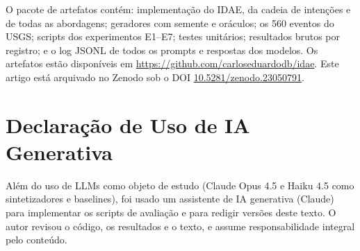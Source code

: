 \documentclass[sigconf,nonacm]{acmart}
\begin{document}
O pacote de artefatos contém: implementação do IDAE, da cadeia de intenções e de todas as abordagens; geradores com semente e oráculos; os 560 eventos do USGS; scripts dos experimentos E1--E7; testes unitários; resultados brutos por registro; e o log JSONL de todos os prompts e respostas dos modelos. Os artefatos estão disponíveis em \url{https://github.com/carloseduardodb/idae}. Este artigo está arquivado no Zenodo sob o DOI \href{https://doi.org/10.5281/zenodo.23050791}{10.5281/zenodo.23050791}.

\section*{Declaração de Uso de IA Generativa}

Além do uso de LLMs como objeto de estudo (Claude Opus 4.5 e Haiku 4.5 como sintetizadores e baselines), foi usado um assistente de IA generativa (Claude) para implementar os scripts de avaliação e para redigir versões deste texto. O autor revisou o código, os resultados e o texto, e assume responsabilidade integral pelo conteúdo.
\end{document}
